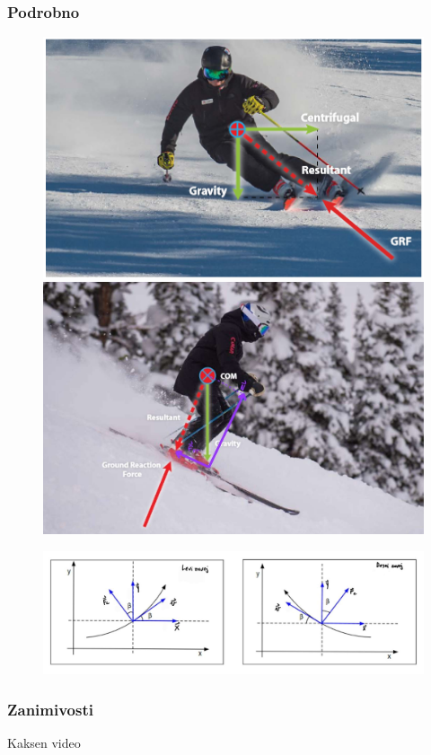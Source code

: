 \documentclass{beamer}
\begin{document}
\begin{frame}
    \frametitle{Podrobno}
    \begin{figure}
        \centering
        \includegraphics[scale=0.4]{../images/Screenshot 2023-12-03 152028.png} 
        \includegraphics[scale=0.09]{../images/Sile pri com.jpg}
    \end{figure}
    \begin{figure}
        \centering
        \includegraphics[scale=0.2]{../images/neke silo ovo ono.jpg} \\
    \end{figure}
\end{frame}

\begin{frame}
    \frametitle{Zanimivosti}
    Kaksen video
\end{frame}
\end{document}
